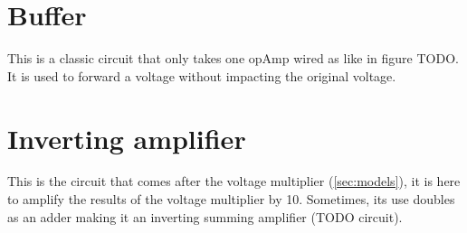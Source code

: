 \label{ap:circuit}

\section{Buffer}\label{apsec:buffer}

This is a classic circuit that only takes one \ac{opAmp} wired as like in figure TODO. It is used to forward a voltage without impacting the original voltage.

\section{Inverting amplifier}\label{apsec:invAmp}

This is the circuit that comes after the voltage multiplier (\cref{sec:models}), it is here to amplify the results of the voltage multiplier by 10. Sometimes, its use doubles as an adder making it an inverting summing amplifier (TODO circuit).

